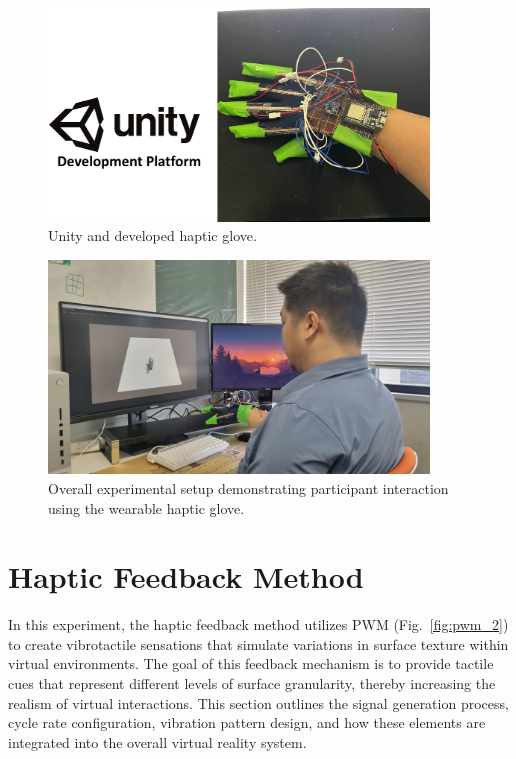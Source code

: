 \begin{figure}[H]\centering
	\includegraphics[width=0.9\textwidth]{Pictures/unity.png}%
	\caption{Unity and developed haptic glove.}\label{fig:unity}%
	
\end{figure}

\begin{figure}[H]\centering
	\includegraphics[width=0.9\textwidth]{Pictures/experiment.png}%
	\caption{Overall experimental setup demonstrating participant interaction using the wearable haptic glove.}\label{fig:experiment}%
	
\end{figure}

\newpage
\section{Haptic Feedback Method}

In this experiment, the haptic feedback method utilizes PWM (Fig.~\ref{fig:pwm_2}) to create vibrotactile sensations that simulate variations in surface texture within virtual environments. The goal of this feedback mechanism is to provide tactile cues that represent different levels of surface granularity, thereby increasing the realism of virtual interactions. This section outlines the signal generation process, cycle rate configuration, vibration pattern design, and how these elements are integrated into the overall virtual reality system.

